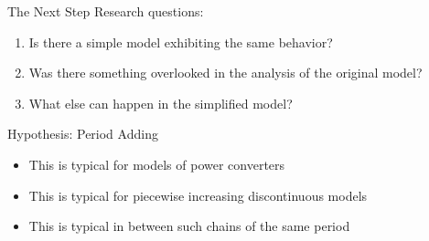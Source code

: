 \begin{frame}{The Next Step}
	\vspace{-1em}
	Research questions:
	\begin{enumerate}
		\item Is there a simple model exhibiting the same behavior? \hfill \checkmark
		\item Was there something overlooked in the analysis of the original model? \hfill \checkmark
		      \pause
		\item What else can happen in the simplified model?
	\end{enumerate}

	\pause
	\vspace{1em}
	Hypothesis: Period Adding
	\begin{itemize}
		\item This is typical for models of power converters
		\item This is typical for piecewise increasing discontinuous models
		\item This is typical in between such chains of the same period
	\end{itemize}
\end{frame}
